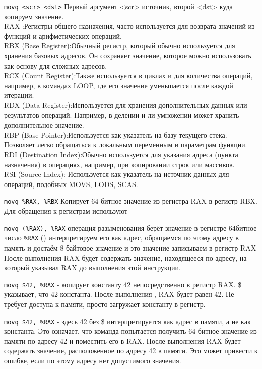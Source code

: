 	\texttt{movq <scr> <dst>} Первый аргумент <scr> источник, второй <dst> куда копируем значение.
	\\
	RAX :Регистры общего назначения, часто 
	используется для возврата значений из функций и арифметических операций.
	\\RBX (Base Register):Обычный регистр, который обычно используется для хранения базовых адресов. Он сохраняет значение, которое можно использовать как основу для сложных адресов.
	\\RCX (Count Register):Также используется в циклах и для количества операций, например, в командах LOOP, где его значение уменьшается после каждой итерации.
	\\RDX (Data Register):Используется для хранения дополнительных данных или результатов операций. Например, в делении и
	ли умножении может хранить дополнительное значение.
	\\RBP (Base Pointer):Используется как указатель на базу текущего стека. Позволяет легко обращаться к локальным переменным и параметрам функции.
	\\RDI (Destination Index):Обычно используется для указания адреса (пункта назначения) в операциях, например, при копировании строк или массивов.
	\\RSI (Source Index): Используется как указатель на источник данных для операций, подобных MOVS, LODS, SCAS.
	
	\texttt{movq \%RAX, \%RBX} Копирует 64-битное значение из регистра RAX в регистр RBX. Для обращения к регистрам используют %
	
	\texttt{movq (\%RAX), \%RAX} операция разыменования берёт значение в регистре 64битное число \texttt{\%RAX} () интерпретируем его как адрес, обращаемся по этому адресу в память и достаём 8 байтовое значение и это значение записываем в регистр RAX После выполнения RAX будет содержать значение, находящееся по адресу, на который указывал RAX до выполнения этой инструкции.
	
	\texttt{movq \$42, \%RAX} - копирует константу 42 непосредственно в регистр RAX. \$ указывает, что 42 константа. После выполнения
	, RAX будет равен 42. Не требует доступа к памяти, просто загружает константу в регистр.
	
    \texttt{movq \$42, \%RAX} - здесь 42 без \$ интерпретируется как адрес в памяти, а не как константа. Это означает, что команда
	попытается получить 64-битное значение из памяти по адресу 42 и поместить его в RAX. После выполнения RAX будет содержать значение, расположенное по адресу 42 в памяти. Это может привести к ошибке, если по этому адресу нет допустимого значения.
	
